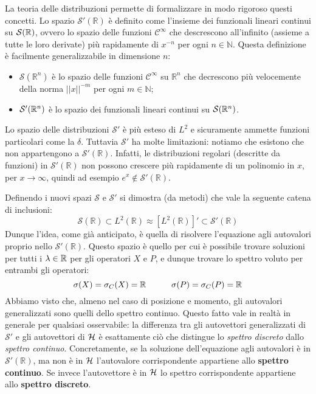 \documentclass[../../FisicaTeorica.tex]{subfiles}
\begin{document}
La teoria delle distribuzioni permette di formalizzare in modo rigoroso questi concetti. Lo spazio $\mathcal{S}'\left(\mathbb{R}\right)$ è definito come l'insieme dei funzionali lineari continui su $\mathcal{S}(\mathbb{R})$, ovvero lo spazio delle funzioni $\mathcal{C}^\infty$ che descrescono all'infinito (assieme a tutte le loro derivate) più rapidamente di $x^{-n}$ per ogni $n \in \mathbb N$. Questa definizione è facilmente generalizzabile in dimensione $n$:
\begin{itemize}
    \item $\mathcal{S}\left(\mathbb{R}^n\right)$ è lo spazio delle funzioni $\mathcal{C}^\infty$ su $\mathbb{R}^n$ che decrescono più velocemente della norma $\left|\left|x\right|\right|^{-m}$ per ogni $m \in \mathbb N$;
    \item $\mathcal{S}'(\mathbb{R}^n)$ è lo spazio dei funzionali lineari continui su $\mathcal{S}(\mathbb{R}^n)$.
\end{itemize}
\begin{oss}
Lo spazio delle distribuzioni $\mathcal S'$ è più esteso di $L^2$ e sicuramente ammette funzioni particolari come la $\delta$. Tuttavia $\mathcal S'$ ha molte limitazioni: notiamo che esistono  che non appartengono a $\mathcal{S}'(\mathbb {R})$. Infatti, le distribuzioni regolari (descritte da funzioni) in $\mathcal{S}'(\mathbb R)$ non possono crescere più rapidamente  di un polinomio in $x$, per $x\rightarrow \infty$, quindi ad esempio $e^x\notin \mathcal{S}'\left(\mathbb{R}\right)$.
\end{oss}
Definendo i nuovi spazi $\mathcal S$ e $\mathcal S'$ si dimostra (da metodi) che vale la seguente catena di inclusioni:
\begin{equation}
\mathcal S\left(\mathbb{R}\right)\subset L^2\left(\mathbb{R}\right) \approx [L^2\left(\mathbb{R}\right)]' \subset \mathcal{S}'\left(\mathbb{R}\right)
\label{eqn:triplettametodi}
\end{equation}
Dunque l'idea, come già anticipato, è quella di risolvere l'equazione agli autovalori proprio nello  $\mathcal{S}'(\mathbb R)$. Questo spazio è quello per cui è possibile trovare soluzioni per tutti i $\lambda \in \mathbb{R}$ per gli operatori $X$ e $P$, e dunque trovare lo spettro voluto per entrambi gli operatori:
\[
\sigma(X) = \sigma_C(X) = \mathbb{R} \qquad \quad \sigma(P) = \sigma_C(P) = \mathbb{R}
\]
Abbiamo visto che, almeno nel caso di posizione e momento, gli autovalori generalizzati sono quelli dello spettro continuo. Questo fatto vale in realtà in generale per qualsiasi osservabile: la differenza tra gli autovettori generalizzati di $\mathcal{S}'$ e gli autovettori  di $\mathcal{H}$ è esattamente ciò che distingue lo \textit{spettro discreto} dallo \textit{spettro continuo}.
Concretamente, se la soluzione dell'equazione agli autovalori è in $\mathcal{S}'\left(\mathbb{R}\right)$, ma non è in $\mathcal{H}$ l'autovalore corrispondente appartiene allo \textbf{spettro continuo}. Se invece l'autovettore è in $\mathcal{H}$ lo spettro corrispondente appartiene allo \textbf{spettro discreto}.\\
\end{document}

